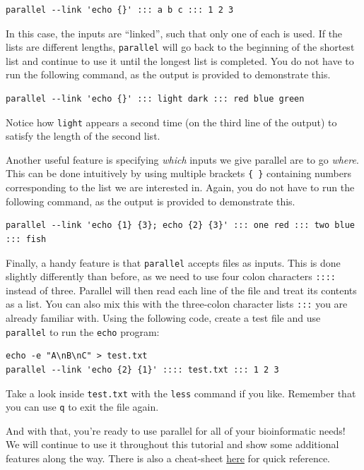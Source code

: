 \documentclass[
]{book}
\begin{document}
\begin{verbatim}
parallel --link 'echo {}' ::: a b c ::: 1 2 3
\end{verbatim}

In this case, the inputs are ``linked'', such that only one of each is used. If the lists are different lengths, \texttt{parallel} will go back to the beginning of the shortest list and continue to use it until the longest list is completed. You do not have to run the following command, as the output is provided to demonstrate this.

\begin{verbatim}
parallel --link 'echo {}' ::: light dark ::: red blue green
\end{verbatim}

Notice how \texttt{light} appears a second time (on the third line of the output) to satisfy the length of the second list.

Another useful feature is specifying \emph{which} inputs we give parallel are to go \emph{where}. This can be done intuitively by using multiple brackets \texttt{\{\ \}} containing numbers corresponding to the list we are interested in. Again, you do not have to run the following command, as the output is provided to demonstrate this.

\begin{verbatim}
parallel --link 'echo {1} {3}; echo {2} {3}' ::: one red ::: two blue ::: fish
\end{verbatim}

Finally, a handy feature is that \texttt{parallel} accepts files as inputs. This is done slightly differently than before, as we need to use four colon characters \texttt{::::} instead of three. Parallel will then read each line of the file and treat its contents as a list. You can also mix this with the three-colon character lists \texttt{:::} you are already familiar with. Using the following code, create a test file and use \texttt{parallel} to run the \texttt{echo} program:

\begin{verbatim}
echo -e "A\nB\nC" > test.txt
parallel --link 'echo {2} {1}' :::: test.txt ::: 1 2 3
\end{verbatim}

Take a look inside \texttt{test.txt} with the \texttt{less} command if you like. Remember that you can use \texttt{q} to exit the file again.

And with that, you're ready to use parallel for all of your bioinformatic needs! We will continue to use it throughout this tutorial and show some additional features along the way. There is also a cheat-sheet \href{https://www.gnu.org/software/parallel/parallel_cheat.pdf}{here} for quick reference.
\end{document}
